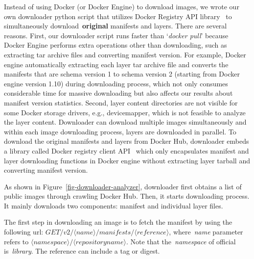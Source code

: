 Instead of using Docker (or Docker Engine) to download images, we wrote our own downloader python script that utilizes Docker Registry API library~\cite{XXX} to simultaneously download~\textbf{original} manifests and layers.
%
%
%
There are several reasons.
%
First, our downloader script runs faster than `\textit{docker pull}' because Docker Engine performs extra operations other than downloading, such as extracting tar archive files and converting manifest version. 
%
For example, Docker engine automatically extracting each layer tar archive file and converts the manifests that are schema version 1 to schema version 2 (starting from Docker engine version 1.10) during downloading process, which not only consumes considerable time for massive downloading but also affects our results about manifest version statistics.
%
Second, layer content directories are not visible for some Docker storage drivers, e.g., devicemapper, which is not feasible to analyze the layer content. 
%
%
Downloader can download multiple images simultaneously and within each image downloading process, layers are downloaded in parallel.
%
To download the original manifests and layers from Docker Hub, downloader embeds a library called Docker registry client API~\cite{xxx} which only encapsulates manifest and layer downloading functions in Docker engine without extracting layer tarball and converting manifest version. 
%
%




%
As shown in Figure~\ref{fig-downloader-analyzer}, downloader first obtains a list of public images through crawling Docker Hub.
%
Then, it starts downloading process.
%
It mainly downloads two components: manifest and individual layer files. 



The first step in downloading an image is to fetch the manifest by using the following url: $GET /v2/\langle name \rangle/manifests/\langle reference \rangle$, where~\textit{name} parameter refers to $\langle namespace\rangle/\langle repository name \rangle$.
%
Note that the~\textit{namespace} of official is~\textit{library}.
%
The reference can include a tag or digest.
%
%




